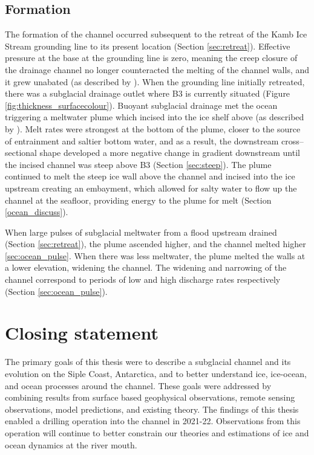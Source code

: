 \subsection{Formation}
The formation of the channel occurred subsequent to the retreat of the Kamb Ice Stream grounding line to its present location (Section \ref{sec:retreat}). Effective pressure at the base at the grounding line is zero, meaning the creep closure of the drainage channel no longer counteracted the melting of the channel walls, and it grew unabated (as described by \cite{drews2015evolution}). 
When the grounding line initially retreated, there was a subglacial drainage outlet where B3 is currently situated (Figure \ref{fig:thickness_surfacecolour}). Buoyant subglacial drainage met the ocean triggering a meltwater plume which incised into the ice shelf above (as described by \cite{hewitt2020subglacial}). Melt rates were strongest at the bottom of the plume, closer to the source of entrainment and saltier bottom water, and as a result, the downstream cross--sectional shape developed a more negative change in gradient downstream until the incised channel was steep above B3 (Section \ref{sec:steep}). The plume continued to melt the steep ice wall above the channel and incised into the ice upstream creating an embayment, which allowed for salty water to flow up the channel at the seafloor, providing energy to the plume for melt (Section \ref{ocean_discuss}). 

When large pulses of subglacial meltwater from a flood upstream drained (Section \ref{sec:retreat}), the plume ascended higher, and the channel melted higher \ref{sec:ocean_pulse}. When there was less meltwater, the plume melted the walls at a lower elevation, widening the channel. The widening and narrowing of the channel correspond to periods of low and high discharge rates respectively (Section \ref{sec:ocean_pulse}).

\section{Closing statement}

The primary goals of this thesis were to describe a subglacial channel and its evolution on the Siple Coast, Antarctica, and to better understand ice, ice-ocean, and ocean processes around the channel. These goals were addressed by combining results from surface based geophysical observations, remote sensing observations, model predictions, and existing theory.  
The findings of this thesis enabled a drilling operation into the channel in 2021-22. Observations from this operation will continue to better constrain our theories and estimations of ice and ocean dynamics at the river mouth.








